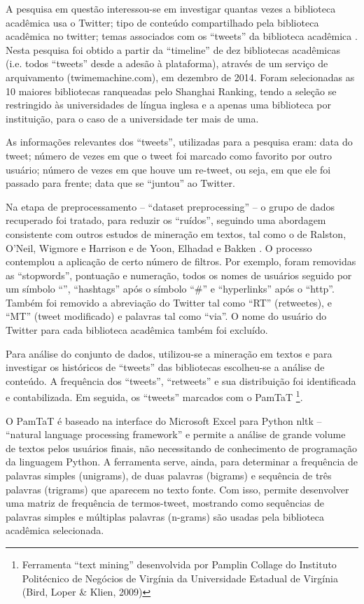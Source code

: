 A pesquisa em questão interessou-se em investigar quantas vezes a biblioteca acadêmica usa o Twitter; tipo de conteúdo compartilhado pela biblioteca acadêmica no twitter; temas associados com os ``tweets'' da biblioteca acadêmica \cite{Al-Daihani2016}. Nesta pesquisa foi obtido a partir da ``timeline'' de dez bibliotecas acadêmicas (i.e. todos ``tweets'' desde a adesão à plataforma), através de um serviço de arquivamento (twimemachine.com), em dezembro de 2014. Foram selecionadas as 10 maiores bibliotecas ranqueadas pelo Shanghai Ranking, tendo a seleção se restringido às universidades de língua inglesa e a apenas uma biblioteca por instituição, para o caso de a universidade ter mais de uma. 

As informações relevantes dos ``tweets'', utilizadas para a pesquisa eram: data do tweet; número de vezes em que o tweet foi marcado como favorito por outro usuário; número de vezes em que houve um re-tweet, ou seja, em que ele foi passado para frente; data que se “juntou” ao Twitter.

Na etapa de preprocessamento -- ``dataset preprocessing'' -- o grupo de dados recuperado foi tratado, para reduzir os ``ruídos'', seguindo uma abordagem consistente com outros estudos de mineração em textos, tal como o de Ralston, O'Neil, Wigmore e Harrison \cite{ralston2014exploration} e de Yoon, Elhadad e Bakken \cite{yoon2013practical}. O processo contemplou a aplicação de certo número de filtros. Por exemplo, foram removidas as ``stopwords'', pontuação e numeração, todos os nomes de usuários seguido por um símbolo ``\@'', ``hashtags'' após o símbolo ``\#'' e ``hyperlinks'' após o ``http''. Também foi removido a abreviação do Twitter tal como ``RT'' (retweetes), e ``MT'' (tweet modificado) e palavras tal como ``via''. O nome do usuário do Twitter para cada biblioteca acadêmica também foi excluído. 

Para análise do conjunto de dados, utilizou-se a mineração em textos e para investigar os históricos de ``tweets'' das bibliotecas escolheu-se a análise de conteúdo. A frequência dos ``tweets'', ``retweets'' e sua distribuição foi identificada e contabilizada. Em seguida, os ``tweets'' marcados com o PamTaT \footnote{ Ferramenta ``text mining'' desenvolvida por Pamplin Collage do Instituto Politécnico de Negócios de Virgínia da Universidade Estadual de Virgínia (Bird, Loper \& Klien, 2009)}. 

O PamTaT é baseado na interface do Microsoft Excel para Python nltk -- ``natural language processing framework'' e permite a análise de grande volume de textos pelos usuários finais, não necessitando de conhecimento de programação da linguagem Python. A ferramenta serve, ainda, para determinar a frequência de palavras simples (unigrams), de duas palavras (bigrams) e sequência de três palavras (trigrams) que aparecem no texto fonte. Com isso, permite desenvolver uma matriz de frequência de termos-tweet, mostrando como sequências de palavras simples e múltiplas palavras (n-grams) são usadas pela biblioteca acadêmica selecionada. 

